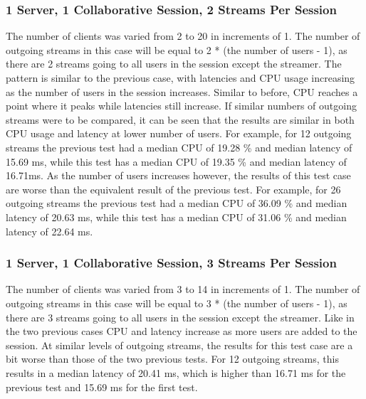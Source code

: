\subsubsection{1 Server, 1 Collaborative Session, 2 Streams Per Session}
\label{sec:1serv_1sess_2str180}

The number of clients was varied from 2 to 20 in increments of 1. The number of outgoing streams in this case will be equal to 2 * (the number of users - 1), as there are 2 streams going to all users in the session except the streamer. The pattern is similar to the previous case, with latencies and CPU usage increasing as the number of users in the session increases. Similar to before, CPU reaches a point where it peaks while latencies still increase. If similar numbers of outgoing streams were to be compared, it can be seen that the results are similar in both CPU usage and latency at lower number of users. For example, for 12 outgoing streams the previous test had a median CPU of 19.28 \% and median latency of 15.69 ms, while this test has a median CPU of 19.35 \% and median latency of 16.71ms. As the number of users increases however, the results of this test case are worse than the equivalent result of the previous test. For example, for 26 outgoing streams the previous test had a median CPU of 36.09 \% and median latency of 20.63 ms, while this test has a median CPU of 31.06 \% and median latency of 22.64 ms.

\subsubsection{1 Server, 1 Collaborative Session, 3 Streams Per Session}
\label{sec:1serv_1sess_3str180}

The number of clients was varied from 3 to 14 in increments of 1. The number of outgoing streams in this case will be equal to 3 * (the number of users - 1), as there are 3 streams going to all users in the session except the streamer. Like in the two previous cases CPU and latency increase as more users are added to the session. At similar levels of outgoing streams, the results for this test case are a bit worse than those of the two previous tests. For 12 outgoing streams, this results in a median latency of 20.41 ms, which is higher than 16.71 ms for the previous test and 15.69 ms for the first test.

